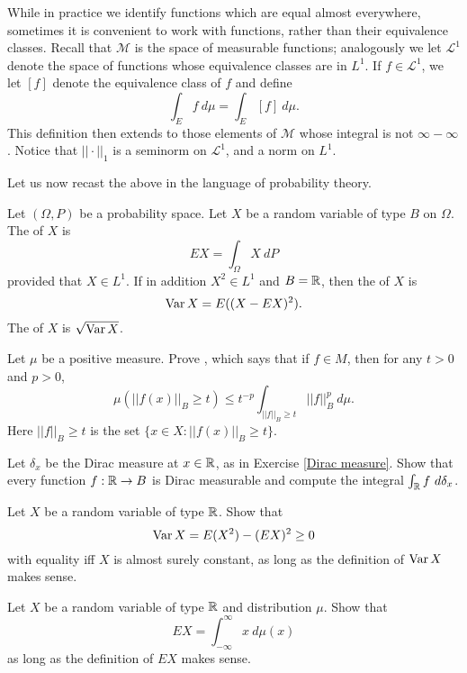 \begin{subsec}
While in practice we identify functions which are equal almost everywhere, sometimes it is convenient to work with functions, rather than their equivalence classes.
Recall that $\mathcal M$ is the space of measurable functions; analogously we let $\mathcal L^1$ denote the space of functions whose equivalence classes are in $L^1$. If $f \in \mathcal L^1$, we let $[f]$ denote the equivalence class of $f$ and define
$$\int_E f ~d\mu = \int_E [f]~d\mu.$$
This definition then extends to those elements of $\mathcal M$ whose integral is not $\infty - \infty$.
Notice that $||\cdot||_1$ is a seminorm on $\mathcal L^1$, and a norm on $L^1$.
\end{subsec}

\begin{subsec}
Let us now recast the above in the language of probability theory.
\end{subsec}

\begin{definition}
Let $(\Omega, P)$ be a probability space.
Let $X$ be a random variable of type $B$ on $\Omega$.
The  of $X$ is
$$EX = \int_\Omega X~dP$$
provided that $X \in L^1$.
If in addition $X^2 \in L^1$ and $B = \mathbb{R}$, then the  of $X$ is
$$\operatorname{Var} X = E((X - EX)^2).$$
The  of $X$ is $\sqrt{\operatorname{Var} X}$.
\end{definition}

\begin{exercise}
\label{Chebyshev}
Let $\mu$ be a positive measure.
Prove , which says that if $f \in M$, then for any $t > 0$ and $p > 0$,
$$\mu(||f(x)||_B \geq t) \leq t^{-p} \int_{||f||_B \geq t} ||f||_B^p~d\mu.$$
Here $||f||_B \geq t$ is the set $\{x \in X: ||f(x)||_B \geq t\}$.
\end{exercise}

\begin{exercise}
Let $\delta_x$ be the Dirac measure at $x \in \mathbb{R}$, as in Exercise \ref{Dirac measure}.
Show that every function $f: \mathbb{R} \to B$ is Dirac measurable and compute the integral $\int_{\mathbb{R}} f~d\delta_x$.
\end{exercise}

\begin{exercise}
Let $X$ be a random variable of type $\mathbb{R}$. Show that
$$\operatorname{Var} X = E(X^2) - (EX)^2 \geq 0$$
with equality iff $X$ is almost surely constant, as long as the definition of $\operatorname{Var} X$ makes sense.
\end{exercise}

\begin{exercise}
\label{integrating a distribution}
Let $X$ be a random variable of type $\mathbb{R}$ and distribution $\mu$. Show that
$$EX = \int_{-\infty}^\infty x ~d\mu(x)$$
as long as the definition of $EX$ makes sense.
\end{exercise}
